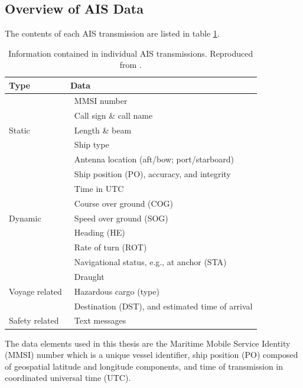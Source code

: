 \documentclass{mldsmsc}
\begin{document}
\subsection{Overview of AIS Data}
The contents of each AIS transmission are listed in table \ref{tbl:transmission-content}. 

	
\newcommand{\myitem}[1]{\textbullet\ #1}

	\begin{table}[H]
		\centering
		\caption{Information contained in individual AIS transmissions. Reproduced from \protect\cite{wolsing_anomaly_2022}.}
		\label{tbl:transmission-content}
		
		\begin{tabular}{ll}
			\hline\hline
			\textbf{Type} & \textbf{Data} \\
			\hline
			\multirow{5}{*}{Static} & \myitem{MMSI number} \\
			& \myitem{Call sign \& call name} \\
			& \myitem{Length \& beam} \\
			& \myitem{Ship type} \\
			& \myitem{Antenna location (aft/bow; port/starboard)} \\
			\hline
			\multirow{7}{*}{Dynamic} & \myitem{Ship position (PO), accuracy, and integrity} \\
			& \myitem{Time in UTC} \\
			& \myitem{Course over ground (COG)} \\
			& \myitem{Speed over ground (SOG)} \\
			& \myitem{Heading (HE)} \\
			& \myitem{Rate of turn (ROT)} \\
			& \myitem{Navigational status, e.g., at anchor (STA)} \\
			\hline
			\multirow{3}{*}{Voyage related} & \myitem{Draught} \\
			& \myitem{Hazardous cargo (type)} \\
			& \myitem{Destination (DST), and estimated time of arrival} \\
			\hline
			Safety related & \myitem{Text messages} \\
			\hline\hline
		\end{tabular}
	\end{table}


The data elements used in this thesis are the Maritime Mobile Service Identity (MMSI) number which is a unique vessel identifier, ship position (PO) composed of geospatial latitude and longitude components, and time of transmission in coordinated universal time (UTC).
\end{document}
